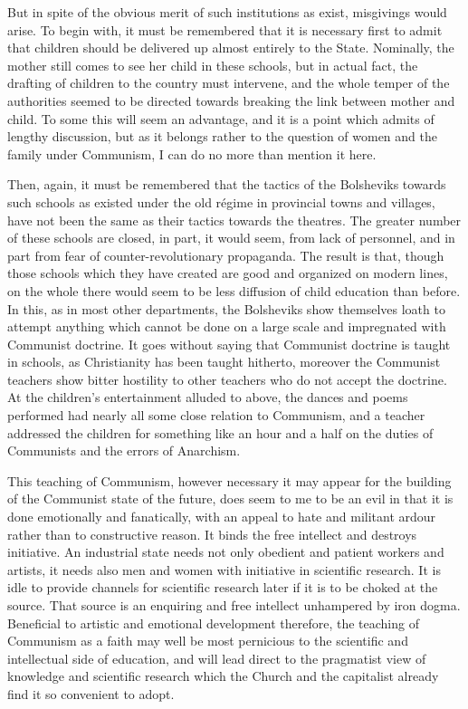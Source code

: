 But in spite of the obvious merit of such institutions as exist, misgivings would arise. To begin with, it must be remembered that it is necessary first to admit that children should be delivered up almost entirely to the State. Nominally, the mother still comes to see her child in these schools, but in actual fact, the drafting of children to the country must intervene, and the whole temper of the authorities seemed to be directed towards breaking the link between mother and child. To some this will seem an advantage, and it is a point which admits of lengthy discussion, but as it belongs rather to the question of women and the family under Communism, I can do no more than mention it here.

Then, again, it must be remembered that the tactics of the Bolsheviks towards such schools as existed under the old régime in provincial towns and villages, have not been the same as their tactics towards the theatres. The greater number of these schools are closed, in part, it would seem, from lack of personnel, and in part from fear of counter-revolutionary propaganda. The result is that, though those schools which they have created are good and organized on modern lines, on the whole there would seem to be less diffusion of child education than before. In this, as in most other departments, the Bolsheviks show themselves loath to attempt anything which cannot be done on a large scale and impregnated with Communist doctrine. It goes without saying that Communist doctrine is taught in schools, as Christianity has been taught hitherto, moreover the Communist teachers show bitter hostility to other teachers who do not accept the doctrine. At the children's entertainment alluded to above, the dances and poems performed had nearly all some close relation to Communism, and a teacher addressed the children for something like an hour and a half on the duties of Communists and the errors of Anarchism.

This teaching of Communism, however necessary it may appear for the building of the Communist state of the future, does seem to me to be an evil in that it is done emotionally and fanatically, with an appeal to hate and militant ardour rather than to constructive reason. It binds the free intellect and destroys initiative. An industrial state needs not only obedient and patient workers and artists, it needs also men and women with initiative in scientific research. It is idle to provide channels for scientific research later if it is to be choked at the source. That source is an enquiring and free intellect unhampered by iron dogma. Beneficial to artistic and emotional development therefore, the teaching of Communism as a faith may well be most pernicious to the scientific and intellectual side of education, and will lead direct to the pragmatist view of knowledge and scientific research which the Church and the capitalist already find it so convenient to adopt.

